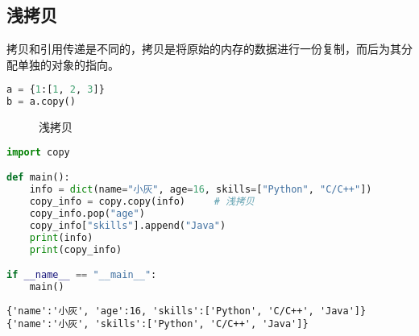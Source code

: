 \vspace{0.5cm}

\subsection{浅拷贝}

拷贝和引用传递是不同的，拷贝是将原始的内存的数据进行一份复制，而后为其分配单独的对象的指向。

\vspace{-0.5cm}

\begin{lstlisting}[language=Python]
a = {1:[1, 2, 3]}
b = a.copy()
\end{lstlisting}

\begin{figure}[H]
	\centering
	\caption{浅拷贝}
\end{figure}

\vspace{0.5cm}


\begin{lstlisting}[language=Python]
import copy

def main():
    info = dict(name="小灰", age=16, skills=["Python", "C/C++"])
    copy_info = copy.copy(info)     # 浅拷贝
    copy_info.pop("age")
    copy_info["skills"].append("Java")
    print(info)
    print(copy_info)

if __name__ == "__main__":
    main()
\end{lstlisting}

\begin{tcolorbox}
	\begin{verbatim}
{'name':'小灰', 'age':16, 'skills':['Python', 'C/C++', 'Java']}
{'name':'小灰', 'skills':['Python', 'C/C++', 'Java']}
\end{verbatim}
\end{tcolorbox}

